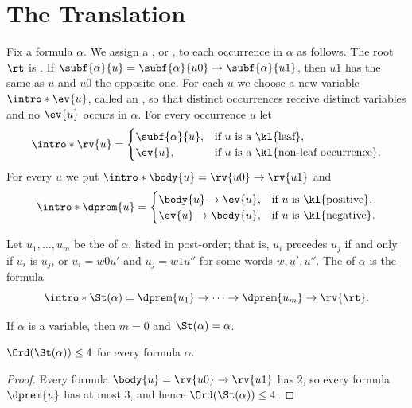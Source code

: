 \section{The Translation}\label{sec:translation}

\AP Fix a formula $\alpha$. We assign a , 
or , to each occurrence in $\alpha$ as follows. The root
$\rt$ is . If
$\subf{\alpha}{u}=\subf{\alpha}{u0}\to\subf{\alpha}{u1}$, then $u1$ has
the same  as $u$ and $u0$ the opposite one. \AP For each
 $u$ we choose a new variable $\intro*\ev{u}$,
called an , so that distinct occurrences receive
distinct variables and no $\ev{u}$ occurs in $\alpha$. For every
occurrence $u$ let
\[
\intro*\rv{u}=\begin{cases}\subf{\alpha}{u},&\text{if $u$ is a \kl{leaf}},\\
\ev{u},&\text{if $u$ is a \kl{non-leaf occurrence}.}\end{cases}
\]
\AP For every  $u$ we put
$\intro*\body{u}=\rv{u0}\to\rv{u1}$ and
\[
\intro*\dprem{u}=\begin{cases}\body{u}\to\ev{u},&\text{if $u$ is \kl{positive}},\\
\ev{u}\to\body{u},&\text{if $u$ is \kl{negative}.}\end{cases}
\]

\begin{definition}\label{def:S}
\AP Let $u_1,\dots,u_m$ be the  of $\alpha$,
listed in post-order; that is, $u_i$ precedes $u_j$ if and only if $u_i$
is  $u_j$, or $u_i=w0u'$ and $u_j=w1u''$ for some
words $w,u',u''$. The  of $\alpha$ is the formula
\[
\intro*\St(\alpha)=\dprem{u_1}\to\dots\to\dprem{u_m}\to\rv{\rt} .
\]
\end{definition}

If $\alpha$ is a variable, then $m=0$ and $\St(\alpha)=\alpha$.

\begin{lemma}\label{lem:order}
$\Ord(\St(\alpha))\le4$ for every formula $\alpha$.
\end{lemma}
\begin{proof}
Every formula $\body{u}=\rv{u0}\to\rv{u1}$ has  $2$, so every
formula $\dprem{u}$ has  at most $3$, and hence
$\Ord(\St(\alpha))\le4$.
\end{proof}

